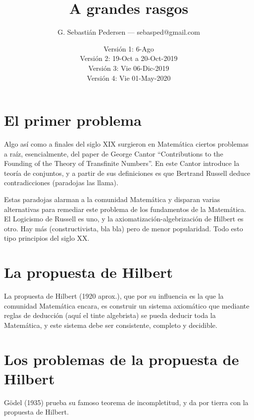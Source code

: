 \documentclass[a4paper,11pt]{article}
\title{A grandes rasgos}
\author{G. Sebastián Pedersen --- sebasped@gmail.com}
\date{Versión 1: 6-Ago\\
Versión 2: 19-Oct a 20-Oct-2019\\
Versión 3: Vie 06-Dic-2019\\
Versión 4: Vie 01-May-2020}
\begin{document}
\maketitle


\tableofcontents
\section{El primer problema}
Algo así como a finales del siglo XIX surgieron en Matemática ciertos problemas a raíz, esencialmente, del paper de George Cantor ``Contributions to the Founding of the Theory of Transfinite Numbers''. En este Cantor introduce la teoría de conjuntos, y a partir de sus definiciones es que Bertrand Russell deduce contradicciones (paradojas las llama).

Estas paradojas alarman a la comunidad Matemática y disparan varias alternativas para remediar este problema de los fundamentos de la Matemática. El Logicismo de Russell es uno, y la axiomatización-algebrización de Hilbert es otro. Hay más (constructivista, bla bla) pero de menor popularidad. Todo esto tipo principios del siglo XX.

\section{La propuesta de Hilbert}
La propuesta de Hilbert (1920 aprox.), que por su influencia es la que la comunidad Matemática encara, es construir un sistema axiomático que mediante reglas de deducción (aquí el tinte algebrista) se pueda deducir toda la Matemática, y este sistema debe ser consistente, completo y decidible.

\section{Los problemas de la propuesta de Hilbert}
Gödel (1935) prueba su famoso teorema de incompletitud, y da por tierra con la propuesta de Hilbert.
\end{document}
